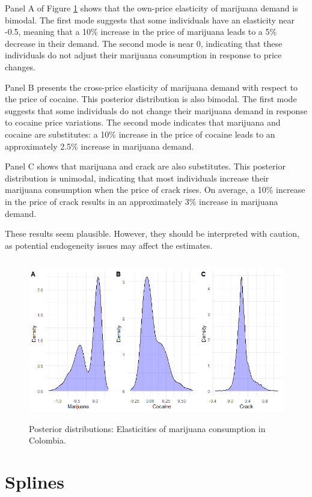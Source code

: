Panel A of Figure \ref{figElastDrugs} shows that the own-price elasticity of marijuana demand is bimodal. The first mode suggests that some individuals have an elasticity near -0.5, meaning that a 10\% increase in the price of marijuana leads to a 5\% decrease in their demand. The second mode is near 0, indicating that these individuals do not adjust their marijuana consumption in response to price changes. 

Panel B presents the cross-price elasticity of marijuana demand with respect to the price of cocaine. This posterior distribution is also bimodal. The first mode suggests that some individuals do not change their marijuana demand in response to cocaine price variations. The second mode indicates that marijuana and cocaine are substitutes: a 10\% increase in the price of cocaine leads to an approximately 2.5\% increase in marijuana demand.

Panel C shows that marijuana and crack are also substitutes. This posterior distribution is unimodal, indicating that most individuals increase their marijuana consumption when the price of crack rises. On average, a 10\% increase in the price of crack results in an approximately 3\% increase in marijuana demand.

These results seem plausible. However, they should be interpreted with caution, as potential endogeneity issues may affect the estimates.
 
\begin{figure}[!h]
	\includegraphics[width=340pt, height=200pt]{Chapters/chapter11/figures/ElastDrugsNew.png}
	\caption[List of figure caption goes here]{Posterior distributions: Elasticities of marijuana consumption in Colombia.}\label{figElastDrugs}
\end{figure}

\section{Splines}\label{sec11_2}

